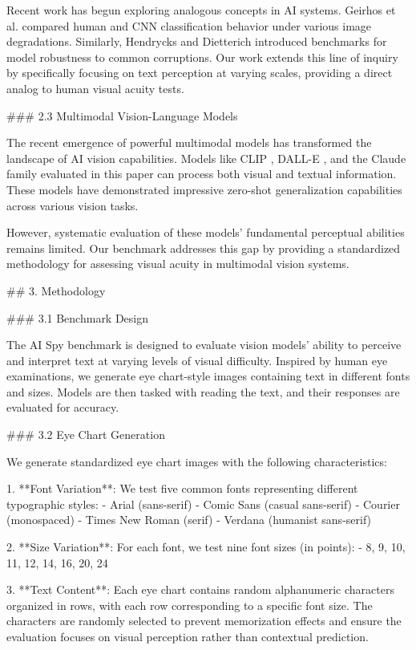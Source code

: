 \documentclass{article}
\begin{document}
Recent work has begun exploring analogous concepts in AI systems. Geirhos et al. \cite{geirhos2018imagenet} compared human and CNN classification behavior under various image degradations. Similarly, Hendrycks and Dietterich \cite{hendrycks2019benchmarking} introduced benchmarks for model robustness to common corruptions. Our work extends this line of inquiry by specifically focusing on text perception at varying scales, providing a direct analog to human visual acuity tests.

### 2.3 Multimodal Vision-Language Models

The recent emergence of powerful multimodal models has transformed the landscape of AI vision capabilities. Models like CLIP \cite{radford2021learning}, DALL-E \cite{ramesh2021zero}, and the Claude family evaluated in this paper can process both visual and textual information. These models have demonstrated impressive zero-shot generalization capabilities across various vision tasks.

However, systematic evaluation of these models' fundamental perceptual abilities remains limited. Our benchmark addresses this gap by providing a standardized methodology for assessing visual acuity in multimodal vision systems.

## 3. Methodology

### 3.1 Benchmark Design

The AI Spy benchmark is designed to evaluate vision models' ability to perceive and interpret text at varying levels of visual difficulty. Inspired by human eye examinations, we generate eye chart-style images containing text in different fonts and sizes. Models are then tasked with reading the text, and their responses are evaluated for accuracy.

### 3.2 Eye Chart Generation

We generate standardized eye chart images with the following characteristics:

1. **Font Variation**: We test five common fonts representing different typographic styles:
   - Arial (sans-serif)
   - Comic Sans (casual sans-serif)
   - Courier (monospaced)
   - Times New Roman (serif)
   - Verdana (humanist sans-serif)

2. **Size Variation**: For each font, we test nine font sizes (in points):
   - 8, 9, 10, 11, 12, 14, 16, 20, 24

3. **Text Content**: Each eye chart contains random alphanumeric characters organized in rows, with each row corresponding to a specific font size. The characters are randomly selected to prevent memorization effects and ensure the evaluation focuses on visual perception rather than contextual prediction.
\end{document}
